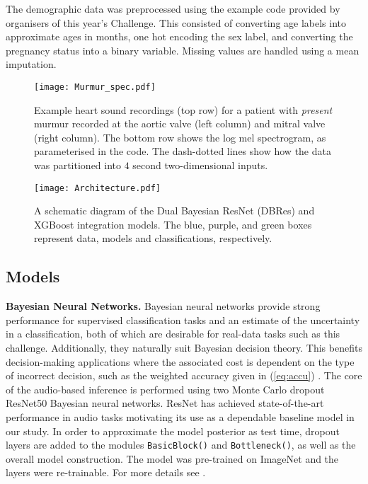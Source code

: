 \documentclass[twocolumn]{cinc}
\begin{document}
The demographic data was preprocessed using the example code provided by organisers of this year's Challenge. This consisted of converting age labels into approximate ages in months, one hot encoding the sex label, and converting the pregnancy status into a binary variable. Missing values are handled using a mean imputation.

\begin{figure}[htbp]
\texttt{[image: Murmur\_spec.pdf]}
\caption{Example heart sound recordings (top row) for a patient with \textit{present} murmur recorded at the aortic valve (left column) and mitral valve (right column). The bottom row shows the log mel spectrogram, as parameterised in the code. The dash-dotted lines show how the data was partitioned into $4$ second two-dimensional inputs.}
\label{fig:mel_spec}
\end{figure}





\begin{figure}[htbp]
\texttt{[image: Architecture.pdf]}
\caption{A schematic diagram of the Dual Bayesian ResNet (DBRes) and XGBoost integration models. The blue, purple, and green boxes represent data, models and classifications, respectively.}
\label{fig:architecture}
\end{figure}



\subsection{Models} {\bf Bayesian Neural Networks.} Bayesian neural networks provide strong performance for supervised classification tasks and an estimate of the uncertainty in a classification, both of which are desirable for real-data tasks such as this challenge. Additionally, they naturally suit Bayesian decision theory. This benefits decision-making applications where the associated cost is dependent on the type of incorrect decision, such as the weighted accuracy given in (\ref{eq:accu}) \cite{cobb2018loss}. The core of the audio-based inference is performed using two
Monte Carlo dropout ResNet50 Bayesian neural networks. ResNet has achieved state-of-the-art performance in audio tasks \cite{palanisamy2020rethinking} motivating its use as a dependable baseline model in our study. In order to approximate the model posterior as test time, dropout layers are added to the modules \texttt{BasicBlock()} and \texttt{Bottleneck()}, as well as the overall model construction. The model was pre-trained on ImageNet and the layers were re-trainable. For more details see \cite[Appendix B.4]{kiskin2021humbugdb}.
\end{document}
